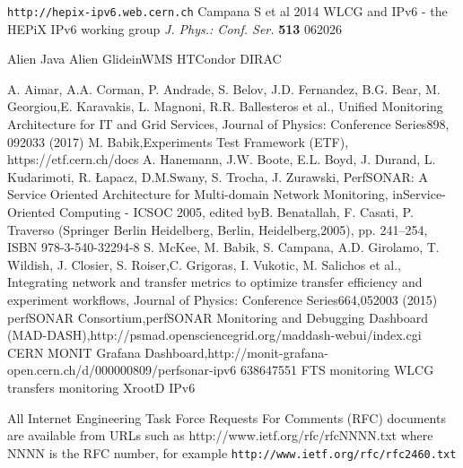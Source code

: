 \begin{thebibliography}{}
%
%


 {\tt http://hepix-ipv6.web.cern.ch}
 Campana S et al 2014 WLCG and IPv6 - the HEPiX IPv6 working group {\it J. Phys.: Conf. Ser.} {\bf513} 062026



  Alien
 Java Alien
 GlideinWMS
 HTCondor
 DIRAC

 A. Aimar, A.A. Corman, P. Andrade, S. Belov, J.D. Fernandez, B.G. Bear, M. Georgiou,E. Karavakis, L. Magnoni, R.R. Ballesteros et al., Unified Monitoring Architecture for IT and Grid Services, Journal of Physics: Conference Series898, 092033 (2017)
 M. Babik,Experiments Test Framework (ETF), https://etf.cern.ch/docs
 A.  Hanemann,  J.W.  Boote,  E.L.  Boyd,  J.  Durand,  L.  Kudarimoti,  R.  Łapacz,  D.M.Swany, S. Trocha, J. Zurawski, PerfSONAR: A Service Oriented Architecture for Multi-domain Network Monitoring, inService-Oriented Computing - ICSOC 2005, edited byB. Benatallah, F. Casati, P. Traverso (Springer Berlin Heidelberg, Berlin, Heidelberg,2005), pp. 241–254, ISBN 978-3-540-32294-8
  S. McKee, M. Babik, S. Campana, A.D. Girolamo, T. Wildish, J. Closier, S. Roiser,C. Grigoras, I. Vukotic, M. Salichos et al., Integrating network and transfer metrics to optimize transfer efficiency and experiment workflows, Journal of Physics:  Conference Series664,052003 (2015)
 perfSONAR Consortium,perfSONAR Monitoring and Debugging Dashboard (MAD-DASH),http://psmad.opensciencegrid.org/maddash-webui/index.cgi
 CERN  MONIT  Grafana  Dashboard,http://monit-grafana-open.cern.ch/d/000000809/perfsonar-ipv6
  638647551
  FTS monitoring
  WLCG transfers monitoring
  XrootD IPv6

 All Internet Engineering Task Force Requests For Comments (RFC) documents are available
from URLs such as http://www.ietf.org/rfc/rfcNNNN.txt where NNNN is the RFC number, for example {\tt http://www.ietf.org/rfc/rfc2460.txt}


\end{thebibliography}
